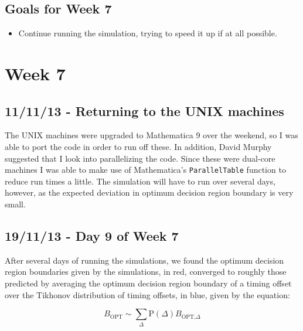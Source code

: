 \subsection{Goals for Week 7}

\begin{itemize}
\itemsep1pt\parskip0pt
\item
  Continue running the simulation, trying to speed it up if at all
  possible.
\end{itemize}

\section{Week 7}

\subsection{11/11/13 - Returning to the UNIX machines}

The UNIX machines were upgraded to Mathematica 9 over the weekend, so I
was able to port the code in order to run off these. In addition, David Murphy
suggested that I look into parallelizing the code. Since these were
dual-core machines I was able to make use of Mathematica's
\texttt{ParallelTable} function to reduce run times a little. The
simulation will have to run over several days, however, as the expected
deviation in optimum decision region boundary is very small.

\subsection{19/11/13 - Day 9 of Week 7}

After several days of running the simulations, we found the optimum
decision region boundaries given by the simulations, in red, converged
to roughly those predicted by averaging the optimum decision region
boundary of a timing offset over the Tikhonov distribution of timing
offsets, in blue, given by the equation:

\[
B_{\text{OPT}} \sim \sum_{\Delta} \text{P}(\Delta) B_{\text{OPT,}\Delta}
\]

